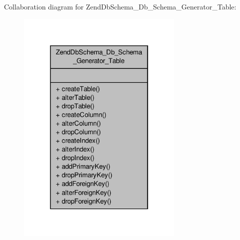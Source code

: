 Collaboration diagram for Zend\-Db\-Schema\-\_\-\-Db\-\_\-\-Schema\-\_\-\-Generator\-\_\-\-Table\-:\nopagebreak
\begin{figure}[H]
\begin{center}
\leavevmode
\includegraphics[width=226pt]{interfaceZendDbSchema__Db__Schema__Generator__Table__coll__graph}
\end{center}
\end{figure}
